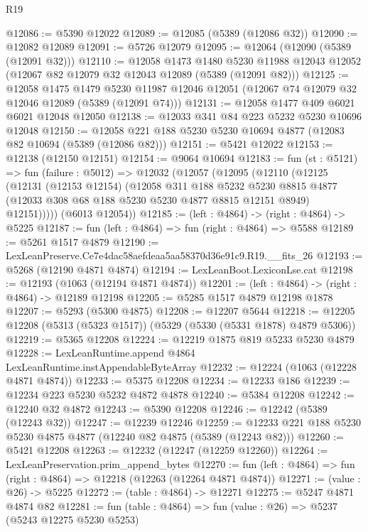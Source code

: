\begin{lexlean}{R19}
\begin{coremodule}
@12086 := @5390 @12022
@12089 := @12085 (@5389 (@12086 @32))
@12090 := @12082 @12089
@12091 := @5726 @12079
@12095 := @12064 (@12090 (@5389 (@12091 @32)))
@12110 := @12058
    @1473
    @1480
    @5230
    @11988
    @12043
    @12052
    (@12067 @82 @12079 @32 @12043 @12089 (@5389 (@12091 @82)))
@12125 := @12058
    @1475
    @1479
    @5230
    @11987
    @12046
    @12051
    (@12067 @74 @12079 @32 @12046 @12089 (@5389 (@12091 @74)))
@12131 := @12058 @1477 @409 @6021 @6021 @12048 @12050
@12138 := @12033 @341 @84 @223 @5232 @5230 @10696 @12048
@12150 := @12058 @221 @188 @5230 @5230 @10694 @4877 (@12083 @82 @10694 (@5389 (@12086 @82)))
@12151 := @5421 @12022
@12153 := @12138 (@12150 @12151)
@12154 := @9064 @10694
@12183 := fun (st : @5121) =>
  fun (failure : @5012) =>
  @12032
    (@12057
      (@12095
        (@12110
          (@12125
            (@12131
              (@12153 @12154)
              (@12058
                @311
                @188
                @5232
                @5230
                @8815
                @4877
                (@12033 @308 @68 @188 @5230 @5230 @4877 @8815 @12151 @8949)
                @12151)))))
      (@6013 @12054))
@12185 := (left : @4864) -> (right : @4864) -> @5225
@12187 := fun (left : @4864) => fun (right : @4864) => @5588
@12189 := @5261 @1517 @4879
@12190 := LexLeanPreserve.Ce7e4dac58aefdeaa5aa58370d36e91c9.R19.__fits_26
@12193 := @5268 (@12190 @4871 @4874)
@12194 := LexLeanBoot.LexiconLse.cat
@12198 := @12193 (@1063 (@12194 @4871 @4874))
@12201 := (left : @4864) -> (right : @4864) -> @12189 @12198
@12205 := @5285 @1517 @4879 @12198 @1878
@12207 := @5293 (@5300 @4875)
@12208 := @12207 @5644
@12218 := @12205 @12208 (@5313 (@5323 @1517)) (@5329 (@5330 (@5331 @1878) @4879 @5306))
@12219 := @5365 @12208
@12224 := @12219 @1875 @819 @5233 @5230 @4879
@12228 := LexLeanRuntime.append @4864 LexLeanRuntime.instAppendableByteArray
@12232 := @12224 (@1063 (@12228 @4871 @4874))
@12233 := @5375 @12208
@12234 := @12233 @186
@12239 := @12234 @223 @5230 @5232 @4872 @4878
@12240 := @5384 @12208
@12242 := @12240 @32 @4872
@12243 := @5390 @12208
@12246 := @12242 (@5389 (@12243 @32))
@12247 := @12239 @12246
@12259 := @12233 @221 @188 @5230 @5230 @4875 @4877 (@12240 @82 @4875 (@5389 (@12243 @82)))
@12260 := @5421 @12208
@12263 := @12232 (@12247 (@12259 @12260))
@12264 := LexLeanPreservation.prim_append_bytes
@12270 := fun (left : @4864) => fun (right : @4864) => @12218 (@12263 (@12264 @4871 @4874))
@12271 := (value : @26) -> @5225
@12272 := (table : @4864) -> @12271
@12275 := @5247 @4871 @4874 @82
@12281 := fun (table : @4864) => fun (value : @26) => @5237 (@5243 @12275 @5230 @5253)

\end{coremodule}
\end{lexlean}
